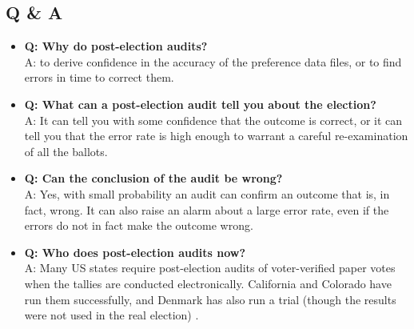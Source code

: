 \documentclass[10pt,a4paper]{article}
\begin{document}
\subsection{Q \& A}
\begin{itemize}
\item {\bf Q: Why do post-election audits?} \\ A: to derive confidence in the accuracy of the preference data files, or to find errors in time to correct them.
\item {\bf Q: What can a post-election audit tell you about the election?} \\ A: It can tell you with some confidence that the outcome is correct, or it can tell you that the error rate is high enough to warrant a careful re-examination of all the ballots.
\item {\bf Q: Can the conclusion of the audit be wrong?} \\ A: Yes, with small probability an audit can confirm an outcome that is, in fact, wrong.  It can also raise an alarm about a large error rate, even if the errors do not in fact make the outcome wrong.
\item {\bf Q: Who does post-election audits now?} \\
A: Many US states require post-election audits of voter-verified paper votes when the tallies are conducted electronically.  California and Colorado have run them successfully, and Denmark has also run a trial (though the results were not used in the real election) .


\end{itemize}
\end{document}
